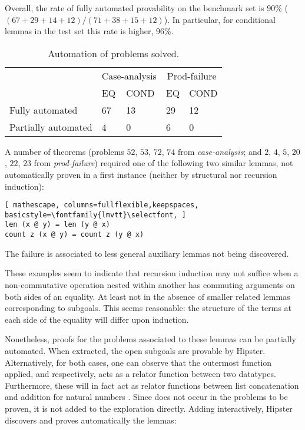 Overall, the rate of fully automated provability on the benchmark set is 90\% ($(67+29+14+12)/(71+38+15+12)$).
%
In particular, for conditional lemmas in the test set this rate is higher, 96\%.


\begin{table}
\begin{tabularx}{\textwidth}{l | X X | X X}
  & \multicolumn{2}{c|}{Case-analysis} & \multicolumn{2}{c}{Prod-failure} \\
  &  EQ & COND & EQ & COND \\
  \hline
  Fully automated & 67 & 13 & 29 & 12 \\
  Partially automated & 4 & 0 & 6 & 0 \\
\end{tabularx}
\caption{Automation of problems solved.}
\label{tab:auto}
\end{table}


A number of theorems (problems $52$, $53$, $72$, $74$ from \emph{case-analysis}; and $2$, $4$, $5$, $20$, $22$, $23$ from \emph{prod-failure}) required one of the following two similar lemmas, not automatically proven in a first instance (neither by structural nor recursion induction):

\begin{lstlisting}[ mathescape, columns=fullflexible,keepspaces, basicstyle=\fontfamily{lmvtt}\selectfont, ]
len (x @ y) = len (y @ x)
count z (x @ y) = count z (y @ x)
\end{lstlisting}

\noindent The failure is associated to less general auxiliary lemmas not being discovered. %

These examples seem to indicate that recursion induction may not suffice when a non-commutative operation nested within another has commuting arguments on both sides of an equality.
%
At least not in the absence of smaller related lemmas corresponding to subgoals.
%
This seems reasonable: the structure of the terms at each side of the equality will differ upon induction.

Nonetheless, proofs for the problems associated to these lemmas can be partially automated.
%
When extracted, the open subgoals are provable by Hipster.
%
Alternatively, for both cases, one can observe that the outermost function applied,  and  respectively, acts as a relator function between two datatypes.
%
Furthermore, these will in fact act as relator functions between list concatenation  and addition for natural numbers .
%
Since  does not occur in the problems to be proven, it is not added to the exploration directly.
%
Adding  interactively, Hipster discovers and proves automatically the lemmas:

